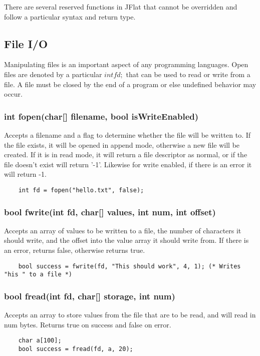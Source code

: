 \begin{homeworkProblem}
	There are several reserved functions in JFlat that cannot be overridden and follow a particular syntax and return type.
	
	\subsection{File I/O}
	
	Manipulating files is an important aspect of any programming languages. Open files are denoted by a particular $int fd;$ that can be used to read or write from a file. A file must be closed by the end of a program or else undefined behavior may occur. 
	\subsubsection{int fopen(char[] filename, bool isWriteEnabled)}
	Accepts a filename and a flag to determine whether the file will be written to. If the file exists, it will be opened in append mode, otherwise a new file will be created. If it is in read mode, it will return a file descriptor as normal, or if the file doesn't exist will return '-1'. Likewise for write enabled, if there is an error it will return -1. 
	\begin{verbatim} 
	int fd = fopen("hello.txt", false);
	\end{verbatim}
		
	\subsubsection{bool fwrite(int fd, char[] values, int num, int offset)}
	Accepts an array of values to be written to a file, the number of characters it should write, and the offset into the value array it should write from. If there is an error, returns false, otherwise returns true. 
	\begin{verbatim} 
	bool success = fwrite(fd, "This should work", 4, 1); (* Writes "his " to a file *)
	\end{verbatim}
	
	\subsubsection{bool fread(int fd, char[] storage, int num)}
	Accepts an array to store values from the file that are to be read, and will read in num bytes. Returns true on success and false on error.
	\begin{verbatim} 
	char a[100];
	bool success = fread(fd, a, 20);
	\end{verbatim}
	

\end{homeworkProblem}
